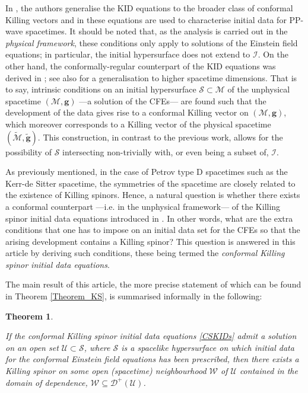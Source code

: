 \documentclass[10pt,a4paper]{article}
\theoremstyle{plain}
\newtheorem*{main}{Theorem}
\def\bmg{{\bm g}}
\begin{document}
In \cite{GarKha19}, the authors generalise the KID equations to the broader class of conformal Killing vectors
and in \cite{Gar22} these equations are used to characterise initial data for PP-wave spacetimes. It should be noted that, as the analysis is carried out in the \emph{physical framework}, these conditions only apply to solutions of the Einstein field equations; in particular, the initial hypersurface does not extend to $\mathscr{I}$. On the other hand, the conformally-regular counterpart of the KID equations was derived in \cite{Pae14a}; see also \cite{MarPeo22}
for a generalisation to higher spacetime dimensions.
That is to say, intrinsic conditions on an initial hypersurface
$\mathcal{S}\subset \mathcal{M}$ of the unphysical spacetime $(\mathcal{M},\bmg)$ ---a solution of the CFEs--- are found such that the development of the data gives rise to a conformal Killing vector on $(\mathcal{M},\bmg)$, which moreover corresponds to a Killing vector of the physical spacetime $(\tilde{\mathcal{M}},\tilde{\bmg})$. This construction, in contrast to the previous work, allows for the possibility of $\mathcal{S}$ intersecting non-trivially with, or even being a subset of, 
$\mathscr{I}$.  

\medskip

As previously mentioned, in the case of Petrov type
D spacetimes such as the Kerr-de Sitter spacetime, the symmetries of
the spacetime are closely related to the existence of Killing spinors.
Hence, a natural question is whether there exists a conformal
counterpart ---i.e. in the unphysical framework--- of the Killing spinor
initial data equations introduced in \cite{GarVal08c}. In other words, what are the extra conditions that one has to impose on an initial data set for the CFEs so that the arising development contains a Killing spinor? This question is answered in
this article by deriving such conditions, these being termed the
\emph{conformal Killing spinor initial data equations}. 

\medskip
The main result of this article, the more precise statement of which
can be found in Theorem \ref{Theorem_KS}, is summarised informally
in the following:

\begin{main}\label{TheoremSummary}

If the conformal Killing spinor initial data equations
\eqref{CSKIDs} admit a solution on an open set $\mathcal{U}\subset
\mathcal{S}$, where $\mathcal{S}$ is a spacelike hypersurface on which
initial data for the conformal Einstein field equations has been
prescribed, then there exists a Killing spinor on some open (spacetime) neighbourhood $\mathcal{W}$ of $\mathcal{U}$ contained in the
domain of dependence, $\mathcal{W}\subseteq\mathcal{D}^+(\mathcal{U})$.
\end{main}
\end{document}
